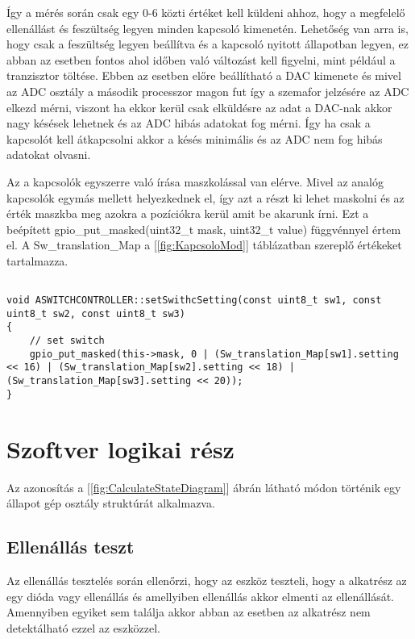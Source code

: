 Így a mérés során csak egy 0-6 közti értéket kell küldeni 
ahhoz, hogy a megfelelő ellenállást és feszültség legyen
minden kapcsoló kimenetén. Lehetőség van arra is, hogy csak 
a feszültség legyen beállítva és a kapcsoló nyitott állapotban legyen,
ez abban az esetben fontos ahol időben való változást kell figyelni,
mint például a tranzisztor töltése. Ebben az esetben előre 
beállítható a DAC kimenete és mivel az ADC osztály a második
processzor magon fut így a szemafor jelzésére az ADC elkezd mérni, 
viszont ha ekkor kerül csak elküldésre az adat a DAC-nak akkor 
nagy késések lehetnek és az ADC hibás adatokat fog mérni.
Így ha csak a kapcsolót kell átkapcsolni akkor a késés minimális és az ADC
nem fog hibás adatokat olvasni.

Az a kapcsolók egyszerre való írása maszkolással van elérve. Mivel az 
analóg kapcsolók egymás mellett helyezkednek el, így azt a 
részt ki lehet maskolni és az érték maszkba meg azokra a pozíciókra
kerül amit be akarunk írni. Ezt a beépített gpio_put_masked(uint32_t mask, uint32_t value)
függvénnyel értem el. A Sw_translation_Map a [\ref{fig:KapcsoloMod}] táblázatban
szereplő értékeket tartalmazza.


\begin{lstlisting}

void ASWITCHCONTROLLER::setSwithcSetting(const uint8_t sw1, const uint8_t sw2, const uint8_t sw3)
{
    // set switch
    gpio_put_masked(this->mask, 0 | (Sw_translation_Map[sw1].setting << 16) | (Sw_translation_Map[sw2].setting << 18) | (Sw_translation_Map[sw3].setting << 20));
}

\end{lstlisting}


\section{Szoftver logikai rész}

Az azonosítás a [\ref{fig:CalculateStateDiagram}] ábrán látható
módon történik egy állapot gép osztály struktúrát alkalmazva.

\subsection{Ellenállás teszt}

Az ellenállás tesztelés során ellenőrzi, hogy az eszköz teszteli, 
hogy a alkatrész az egy dióda vagy ellenállás és amellyiben ellenállás 
akkor elmenti az ellenállását. Amennyiben egyiket sem találja
akkor abban az esetben az alkatrész nem detektálható ezzel az eszközzel.

